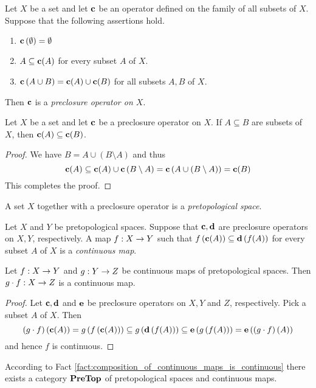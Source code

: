 \begin{definition}
	Let $X$ be a set and let $\mathbf{c}$ be an operator defined on the family of all subsets of $X$. Suppose that the following assertions hold.
	\begin{enumerate}[label=\textbf{(\arabic*)}, leftmargin=3.0em]
		\item $\mathbf{c}\left(\emptyset\right) = \emptyset$
		\item $A\subseteq \mathbf{c}(A)$ for every subset $A$ of $X$.
		\item $\mathbf{c}\left(A \cup B\right) = \mathbf{c}(A)\cup \mathbf{c}(B)$ for all subsets $A, B$ of $X$.
	\end{enumerate}
	Then $\mathbf{c}$ is a \textit{preclosure operator on $X$}.
\end{definition}


\begin{fact}\label{fact:preclosure_operator_is_monotone}
	Let $X$ be a set and let $\mathbf{c}$ be a preclosure operator on $X$. If $A\subseteq B$ are subsets of $X$, then $\mathbf{c}(A) \subseteq \mathbf{c}(B)$.
\end{fact}
\begin{proof}
	We have $B = A\cup \left(B\setminus A\right)$ and thus
	$$\mathbf{c}(A) \subseteq \mathbf{c}(A) \cup \mathbf{c}\left(B\setminus A\right) = \mathbf{c}\left(A \cup \left(B\setminus A\right) \right) = \mathbf{c}(B)$$
	This completes the proof.
\end{proof}

\begin{definition}
	A set $X$ together with a preclosure operator is a \textit{pretopological space}.
\end{definition}

\begin{definition}
	Let $X$ and $Y$ be pretopological spaces. Suppose that $\mathbf{c},\mathbf{d}$ are preclosure operators on $X,Y$, respectively. A map $f:X\rightarrow Y$ such that $f\left(\mathbf{c}(A)\right) \subseteq \mathbf{d}\left(f(A)\right)$ for every subset $A$ of $X$ is a \textit{continuous map}.
\end{definition}

\begin{fact}\label{fact:composition_of_continuous_maps_is_continuous}
	Let $f:X \rightarrow Y$ and $g:Y \rightarrow Z$ be continuous maps of pretopological spaces. Then $g\cdot f:X\rightarrow Z$ is a continuous map.
\end{fact}
\begin{proof}
	Let $\mathbf{c},\mathbf{d}$ and $\mathbf{e}$ be preclosure operators on $X,Y$ and $Z$, respectively. Pick a subset $A$ of $X$. Then
	$$\left(g\cdot f\right)\left(\mathbf{c}(A)\right) = g\left(f\left(\mathbf{c}(A)\right)\right) \subseteq g\left(\mathbf{d}\left(f(A)\right)\right) \subseteq \mathbf{e}\left(g\left(f(A)\right)\right) = \mathbf{e}\left(\left(g\cdot f\right)(A)\right)$$
	and hence $f$ is continuous.
\end{proof}
\noindent
According to Fact \ref{fact:composition_of_continuous_maps_is_continuous} there exists a category $\mathbf{PreTop}$ of pretopological spaces and continuous maps.

